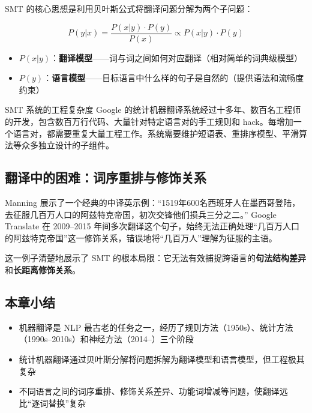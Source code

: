 \documentclass[a4paper]{article}
\begin{document}
SMT 的核心思想是利用贝叶斯公式将翻译问题分解为两个子问题：

$$P(y|x) = \frac{P(x|y) \cdot P(y)}{P(x)} \propto P(x|y) \cdot P(y)$$

\begin{itemize}
    \item $P(x|y)$：\textbf{翻译模型}——词与词之间如何对应翻译（相对简单的词典级模型）
    \item $P(y)$：\textbf{语言模型}——目标语言中什么样的句子是自然的（提供语法和流畅度约束）
\end{itemize}

\begin{warningbox}{SMT 系统的工程复杂度}
Google 的统计机器翻译系统经过十多年、数百名工程师的开发，包含数百万行代码、大量针对特定语言对的手工规则和 hack。每增加一个语言对，都需要重复大量工程工作。系统需要维护短语表、重排序模型、平滑算法等众多独立设计的子组件。
\end{warningbox}

\subsection{翻译中的困难：词序重排与修饰关系}





Manning 展示了一个经典的中译英示例：``1519年600名西班牙人在墨西哥登陆，去征服几百万人口的阿兹特克帝国，初次交锋他们损兵三分之二。'' Google Translate 在 2009--2015 年间多次翻译这个句子，始终无法正确处理``几百万人口的阿兹特克帝国''这一修饰关系，错误地将``几百万人''理解为征服的主语。

这一例子清楚地展示了 SMT 的根本局限：它无法有效捕捉跨语言的\textbf{句法结构差异}和\textbf{长距离修饰关系}。

\subsection{本章小结}

\begin{itemize}
    \item 机器翻译是 NLP 最古老的任务之一，经历了规则方法（1950s）、统计方法（1990s--2010s）和神经方法（2014--）三个阶段
    \item 统计机器翻译通过贝叶斯分解将问题拆解为翻译模型和语言模型，但工程极其复杂
    \item 不同语言之间的词序重排、修饰关系差异、功能词增减等问题，使翻译远比``逐词替换''复杂
\end{itemize}
\end{document}
